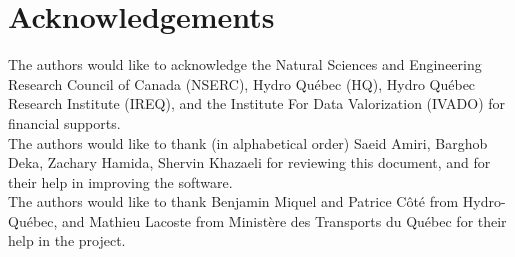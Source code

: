 \section*{Acknowledgements}

The authors would like to acknowledge the Natural Sciences and Engineering Research Council of Canada (NSERC), Hydro Qu\'ebec (HQ), Hydro Qu\'ebec Research Institute (IREQ), and the Institute For Data Valorization (IVADO) for financial supports.\\

The authors would like to thank (in alphabetical order) Saeid Amiri, Barghob Deka, Zachary Hamida, Shervin Khazaeli for reviewing this document, and for their help in improving the software.\\

The authors would like to thank Benjamin Miquel and Patrice C\^ot\'e from Hydro-Qu\'ebec, and Mathieu Lacoste from Minist\`ere des Transports du Qu\'ebec  for their help in the project.